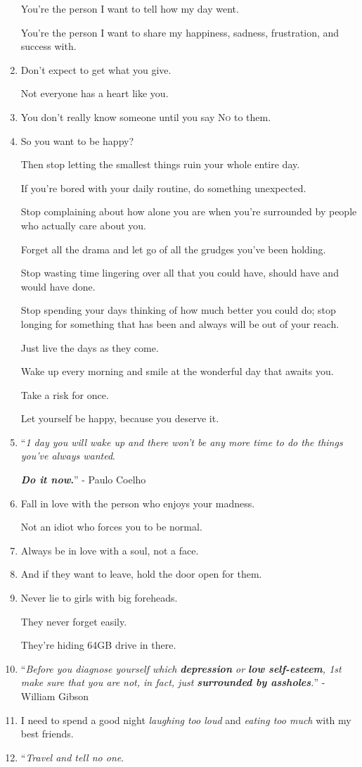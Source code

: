\documentclass{article}
\begin{document}
\begin{enumerate}
	You're the person I want to tell how my day went.
	
	You're the person I want to share my happiness, sadness, frustration, and success with.
	\item Don't expect to get what you give.
	
	Not everyone has a heart like you.
	\item You don't really know someone until you say \textsc{No} to them.
	\item So you want to be happy?
	
	Then stop letting the smallest things ruin your whole entire day.
	
	If you're bored with your daily routine, do something unexpected.
	
	Stop complaining about how alone you are when you're surrounded by people who actually care about you.
	
	Forget all the drama and let go of all the grudges you've been holding.
	
	Stop wasting time lingering over all that you could have, should have and would have done.
	
	Stop spending your days thinking of how much better you could do; stop longing for something that has been and always will be out of your reach.
	
	Just live the days as they come.
	
	Wake up every morning and smile at the wonderful day that awaits you.
	
	Take a risk for once.
	
	Let yourself be happy, because you deserve it.
	\item ``\textit{1 day you will wake up and there won't be any more time to do the things you've always wanted}.
	
	\textbf{\textit{Do it now}.}'' - Paulo Coelho
	\item Fall in love with the person who enjoys your madness.
	
	Not an idiot who forces you to be normal.
	\item Always be in love with a soul, not a face.
	\item And if they want to leave, hold the door open for them.
	\item Never lie to girls with big foreheads.
	
	They never forget easily.
	
	They're hiding 64GB drive in there.
	\item ``\textit{Before you diagnose yourself which \textbf{depression} or \textbf{low self-esteem}, 1st make sure that you are not, in fact, just \textbf{surrounded by assholes}.}'' - William Gibson
	\item I need to spend a good night \textit{laughing too loud} and \textit{eating too much} with my best friends.
	\item ``\textit{Travel and tell no one}.
	

\end{enumerate}
\end{document}
